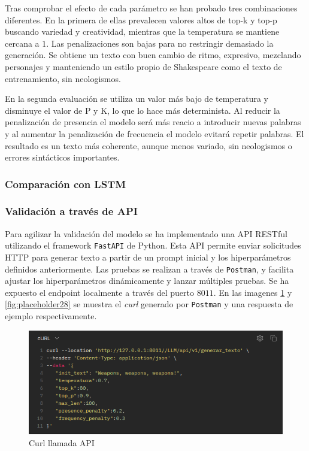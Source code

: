 \documentclass[11pt]{book}
\theoremstyle{plain}
\theoremstyle{definition}
\begin{document}
Tras comprobar el efecto de cada parámetro se han probado tres combinaciones diferentes. 
En la primera de ellas prevalecen valores altos de top-k y top-p buscando variedad y creatividad, mientras que la temperatura se mantiene cercana a $1$. Las penalizaciones son bajas para no restringir demasiado la generación. Se obtiene un texto con buen cambio de ritmo, expresivo, mezclando personajes y manteniendo un estilo propio de Shakespeare como el texto de entrenamiento, sin neologismos. 

En la segunda evaluación se utiliza un valor más bajo de temperatura y disminuye el valor de P y K, lo que lo hace más determinista. Al reducir la penalización de presencia el modelo será más reacio a introducir nuevas palabras y al aumentar la penalización de frecuencia el modelo evitará repetir palabras. El resultado es un texto más coherente, aunque menos variado, sin neologismos o errores sintácticos importantes.



\subsubsection{Comparación con LSTM}


\subsubsection{Validación a través de API}

Para agilizar la validación del modelo se ha implementado una API RESTful utilizando el framework \texttt{FastAPI} de Python. Esta API permite enviar solicitudes HTTP para generar texto a partir de un prompt inicial y los hiperparámetros definidos anteriormente. Las pruebas se realizan a través de \texttt{Postman}, y facilita ajustar los hiperparámetros dinámicamente y lanzar múltiples pruebas. Se ha expuesto el endpoint \textit{} localmente a través del puerto $8011$. En las imagenes \ref{fig:placeholder27} y \ref{fig:placeholder28} se muestra el \textit{curl} generado por \texttt{Postman} y una respuesta de ejemplo respectivamente.

\begin{figure}[h]
    \centering
    \includegraphics[width=0.5\linewidth]{img/api_curl.png}
    \caption{Curl llamada API}
    \label{fig:placeholder27}
\end{figure}
\end{document}

